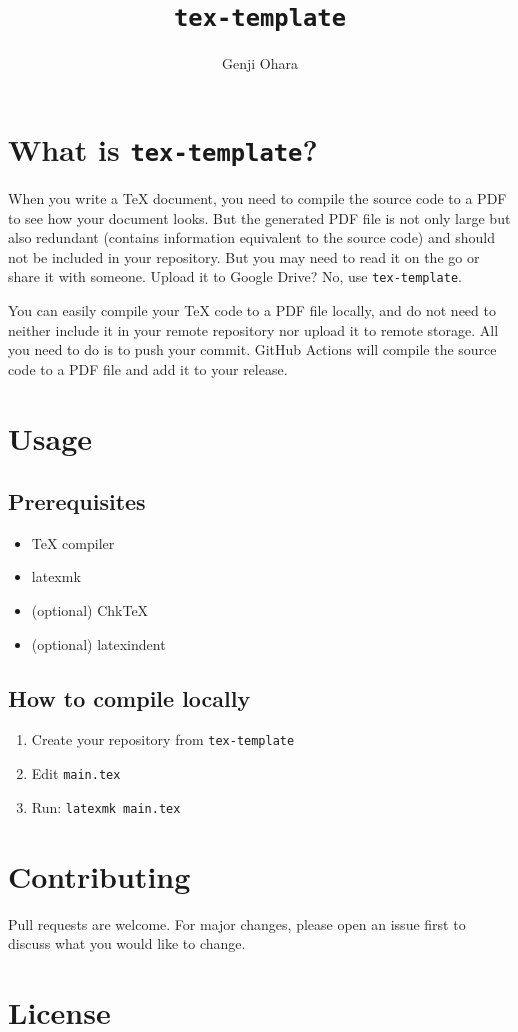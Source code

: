 \documentclass{article}
\title{\texttt{tex-template}}
\author{Genji Ohara}
\begin{document}
\maketitle

\section{What is \texttt{tex-template}?}

When you write a \TeX{} document,
you need to compile the source code to a PDF to see how your document looks.
But the generated PDF file is not only large but also redundant
(contains information equivalent to the source code)
and should not be included in your repository.
But you may need to read it on the go or share it with someone.
Upload it to Google Drive?
No, use \verb|tex-template|.

You can easily compile your \TeX{} code to a PDF file locally,
and do not need to neither include it in your remote repository
nor upload it to remote storage.
All you need to do is to push your commit.
GitHub Actions will compile the source code to a PDF file
and add it to your release.

\section{Usage}

\subsection{Prerequisites}

\begin{itemize}
  \item \TeX{} compiler
  \item latexmk
  \item (optional) Chk\TeX{}
  \item (optional) latexindent
\end{itemize}

\subsection{How to compile locally}

\begin{enumerate}
  \item Create your repository from \verb|tex-template|
  \item Edit \verb|main.tex|
  \item Run: \verb|latexmk main.tex|
\end{enumerate}

\section{Contributing}

Pull requests are welcome.
For major changes,
please open an issue first to discuss what you would like to change.

\section{License}


\end{document}
